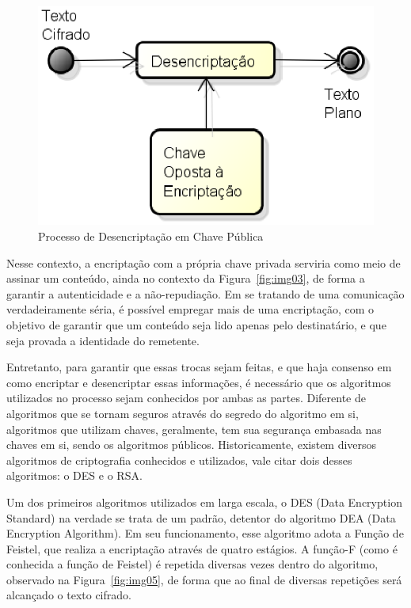 	\begin{figure}[!ht]
		\centering
		\includegraphics[keepaspectratio=true,scale=0.5]{figuras/desencript.eps}
		\caption{Processo de Desencriptação em Chave Pública}
		\label{fig:img04}
	\end{figure}

	Nesse contexto, a encriptação com a própria chave privada serviria como meio de assinar um conteúdo, ainda no contexto da Figura~\ref{fig:img03}, de forma a garantir a autenticidade e a não-repudiação. Em se tratando de uma comunicação verdadeiramente séria, é possível empregar mais de uma encriptação, com o objetivo de garantir que um conteúdo seja lido apenas pelo destinatário, e que seja provada a identidade do remetente.
	
	Entretanto, para garantir  que essas trocas sejam feitas, e que haja consenso em como encriptar e desencriptar essas informações, é necessário que os algoritmos utilizados no processo sejam conhecidos por ambas as partes. Diferente de algoritmos que se tornam seguros através do segredo do algoritmo em si, algoritmos que utilizam chaves, geralmente, tem sua segurança embasada nas chaves em si, sendo os algoritmos públicos. Historicamente, existem diversos algoritmos de criptografia conhecidos e utilizados, vale citar dois desses algoritmos: o DES e o RSA.
	
	Um dos primeiros algoritmos utilizados em larga escala, o DES (Data Encryption Standard) na verdade se trata de um padrão, detentor do algoritmo DEA (Data Encryption Algorithm). Em seu funcionamento, esse algoritmo adota a Função de Feistel, que realiza a encriptação através de quatro estágios. A função-F (como é conhecida a função de Feistel) é repetida diversas vezes dentro do algoritmo, observado na Figura~\ref{fig:img05}, de forma que ao final de diversas repetições será alcançado o texto cifrado.
	
